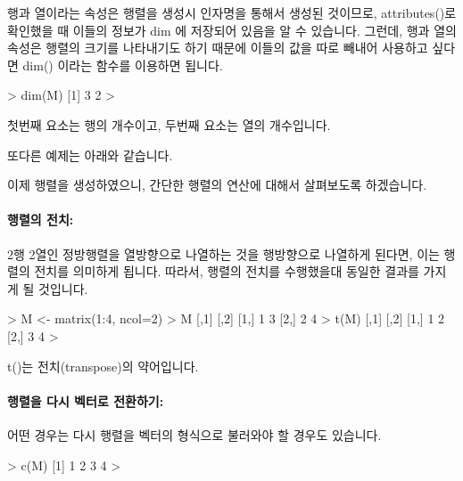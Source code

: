 \documentclass[tutorial.tex]{subfiles}
\begin{document}
행과 열이라는 속성은 행렬을 생성시 인자명을 통해서 생성된 것이므로, attributes()로 확인했을 때 이들의 정보가 dim 에 저장되어 있음을 알 수 있습니다. 
그런데, 행과 열의 속성은 행렬의 크기를 나타내기도 하기 때문에 이들의 값을 따로 빼내어 사용하고 싶다면 dim() 이라는 함수를 이용하면 됩니다. 

\begin{Schunk}
\begin{Soutput}
> dim(M)
[1] 3 2
>
\end{Soutput}
\end{Schunk}

첫번째 요소는 행의 개수이고, 두번째 요소는 열의 개수입니다. 

또다른 예제는 아래와 같습니다. 

\begin{Schunk}
\end{Schunk}

이제 행렬을 생성하였으니, 간단한 행렬의 연산에 대해서 살펴보도록 하겠습니다. 

\paragraph{행렬의 전치: }
2행 2열인 정방행렬을 열방향으로 나열하는 것을 행방향으로 나열하게 된다면, 이는 행렬의 전치를 의미하게 됩니다. 
따라서, 행렬의 전치를 수행했을대 동일한 결과를 가지게 될 것입니다. 

\begin{Schunk}
\begin{Soutput}
> M <- matrix(1:4, ncol=2)
> M
     [,1] [,2]
[1,]    1    3
[2,]    2    4
> t(M)
     [,1] [,2]
[1,]    1    2
[2,]    3    4
> 
\end{Soutput}
\end{Schunk}

t()는 전치(transpose)의 약어입니다.

\paragraph{행렬을 다시 벡터로 전환하기:}
어떤 경우는 다시 행렬을 벡터의 형식으로 불러와야 할 경우도 있습니다. 

\begin{Schunk}
\begin{Soutput}
> c(M)
[1] 1 2 3 4
> 
\end{Soutput}
\end{Schunk}
\end{document}
